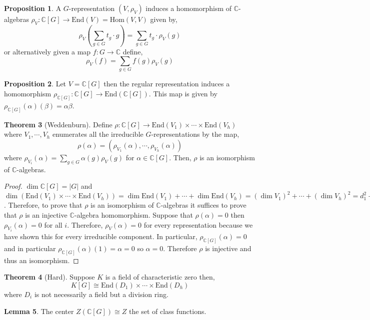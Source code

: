 \documentclass[12pt]{extarticle}
\newcommand{\C}{\mathbb{C}}
\newcommand{\End}[1]{\text{End}\left( #1 \right)}
\newcommand{\Hom}[2]{\mathrm{Hom}\left( #1, #2 \right)}
\theoremstyle{definition}
\newtheorem{theorem}{Theorem}[section]
\newtheorem{lemma}[theorem]{Lemma}
\newtheorem{proposition}[theorem]{Proposition}
\begin{document}
\begin{proposition}
A $G$-representation $(V, \rho_V)$ induces a homomorphism of $\C$-algebras $\rho_V : \C[G] \to \End{V} = \Hom{V}{V}$ given by,
\[ \rho_V \left( \sum_{g \in G} t_g \cdot g \right) = \sum_{g \in G} t_g \cdot \rho_V(g) \]
or alternatively given a map $f : G \to \C$ define,
\[ \rho_V(f) = \sum_{g \in G} f(g) \rho_V(g)\]
\end{proposition}

\begin{proposition}
Let $V = \C[G]$ then the regular representation induces a homomorphism $\rho_{\C[G]} : \C[G] \to \End{\C[G]}$. This map is given by $\rho_{\C[G]}(\alpha)(\beta) = \alpha \beta$. 
\end{proposition}

\begin{theorem}[Weddenburn]
Define $\rho : \C[G] \to \End{V_1} \times \cdots \times \End{V_h}$ where $V_1, \cdots, V_h$ enumerates all the irreducible $G$-representations by the map,
 \[\rho(\alpha) = (\rho_{V_1}(\alpha), \cdots, \rho_{V_h}(\alpha))\] where $\rho_{V_i}(\alpha) = \sum\limits_{g \in G} \alpha(g) \rho_V(g)$ for $\alpha \in \C[G]$. Then, $\rho$ is an isomorphism of $\C$-algebras. 
\end{theorem}


\begin{proof}
$\dim{\C[G]} = |G|$ and $\dim{(\End{V_1} \times \cdots \times \End{V_h})} = \dim{\End{V_1}} + \cdots + \dim{\End{V_h}} = (\dim{V_1})^2 + \cdots + (\dim{V_h})^2 = d_1^2 + \cdots + d_h^2 = |G|$. Therefore, to prove that $\rho$ is an isomorphism of $\C$-algebras it suffices to prove that $\rho$ is an injective $\C$-algebra homomorphism. Suppose that $\rho(\alpha) = 0$ then $\rho_{V_i}(\alpha) = 0$ for all $i$. Therefore, $\rho_V(\alpha) = 0$ for every representation because we have shown this for every irreducible component. In particular, $\rho_{\C[G]}(\alpha) = 0$ and in particular $\rho_{\C[G]}(\alpha)(1) = \alpha = 0$ so $\alpha = 0$. Therefore $\rho$ is injective and thus an isomorphism.  
\end{proof}

\begin{theorem}[Hard]
Suppose $K$ is a field of characteristic zero then,
\[K[G] \cong \End{D_1} \times \cdots \times \End{D_h}\]
where $D_i$ is not necessarily a field but a division ring. 
\end{theorem}

\begin{lemma}
The center $Z(\C[G]) \cong Z$ the set of class functions.
\end{lemma}
\end{document}

